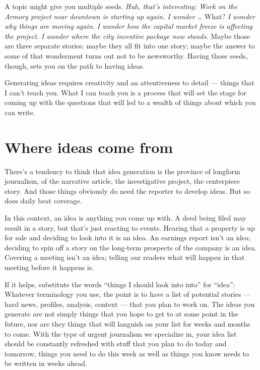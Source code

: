 \documentclass[
  11pt,
  american,
  letterpaperpaper,
  extrafontsizes,onecolumn,openright
  ]{memoir}
\begin{document}
A topic might give you multiple seeds. \emph{Huh, that's interesting: Work on the Armory project near downtown is starting up again. I wonder \ldots{}} What? \emph{I wonder why things are moving again.} \emph{I wonder how the capital market freeze is affecting the project.} \emph{I wonder where the city incentive package now stands.} Maybe those are three separate stories; maybe they all fit into one story; maybe the answer to some of that wonderment turns out not to be newsworthy. Having those seeds, though, sets you on the path to having ideas.

Generating ideas requires creativity and an attentiveness to detail --- things that I can't teach you. What I can teach you is a process that will set the stage for coming up with the questions that will led to a wealth of things about which you can write.

\hypertarget{where-ideas-come-from}{%
\section*{Where ideas come from}\label{where-ideas-come-from}}

There's a tendency to think that idea generation is the province of longform journalism, of the narrative article, the investigative project, the centerpiece story. And those things obviously do need the reporter to develop ideas. But so does daily beat coverage.

In this context, an idea is anything you come up with. A deed being filed may result in a story, but that's just reacting to events. Hearing that a property is up for sale and deciding to look into it is an idea. An earnings report isn't an idea; deciding to spin off a story on the long-term prospects of the company is an idea. Covering a meeting isn't an idea; telling our readers what will happen in that meeting before it happens is.

If it helps, substitute the words \enquote{things I should look into into} for \enquote{idea}: Whatever terminology you use, the point is to have a list of potential stories --- hard news, profiles, analysis, context --- that you plan to work on.
The ideas you generate are not simply things that you hope to get to at some point in the future, nor are they things that will languish on your list for weeks and months to come. With the type of urgent journalism we specialize in, your idea list should be constantly refreshed with stuff that you plan to do today and tomorrow, things you need to do this week as well as things you know needs to be written in weeks ahead.
\end{document}
